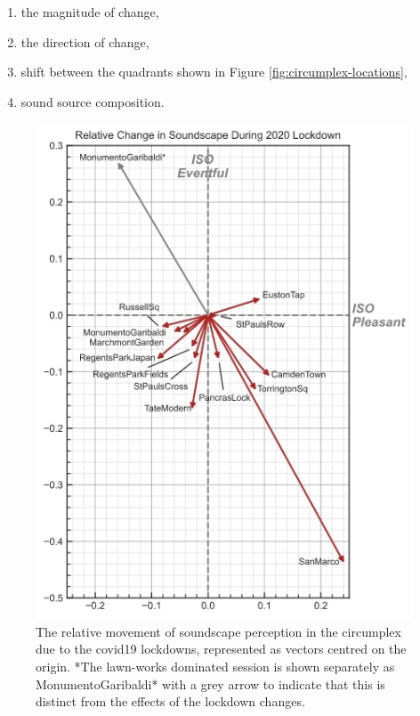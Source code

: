    \begin{enumerate}
     \item the magnitude of change,
     \item the direction of change,
     \item shift between the quadrants shown in Figure \ref{fig:circumplex-locations},
     \item sound source composition.
   \end{enumerate}

   \begin{figure}
     \label{fig:circumplex-vectors}
     \centering
     \includegraphics[width=.75\textwidth]{Figures/Lockdown-Figure6.jpg}
     \caption{The relative movement of soundscape perception in the circumplex due to the \gls{covid19} lockdowns, represented as vectors centred on the origin. *The lawn-works dominated session is shown separately as MonumentoGaribaldi* with a grey arrow to indicate that this is distinct from the effects of the lockdown changes.}
   \end{figure}

